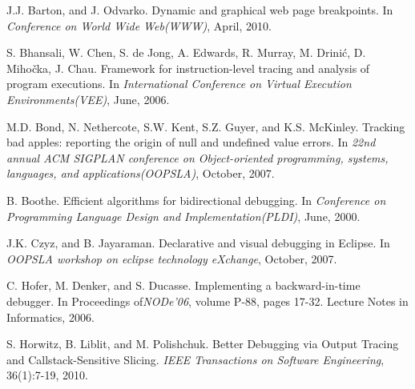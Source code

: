 \documentclass{sig-alternate}
\begin{document}
%

\begin{thebibliography}{16}

J.J. Barton, and J. Odvarko. \newblock Dynamic and graphical web page breakpoints.
\newblock In \emph{Conference on World Wide Web(WWW)},
April, 2010.

S. Bhansali, W. Chen, S. de Jong, A. Edwards, R. Murray, M. Drini\'{c}, D. Miho\v{c}ka, J. Chau. \newblock Framework for instruction-level tracing and analysis of program executions.
\newblock In \emph{International Conference on Virtual Execution Environments(VEE)},
June, 2006.

M.D. Bond, N. Nethercote, S.W. Kent, S.Z. Guyer, and K.S. McKinley. \newblock Tracking bad apples: reporting the origin of null and undefined value errors.
\newblock In \emph{22nd annual ACM SIGPLAN conference on Object-oriented programming, systems, languages, and applications(OOPSLA)},
October, 2007.


B. Boothe. \newblock Efficient algorithms for bidirectional debugging.
\newblock In \emph{Conference on Programming Language Design and Implementation(PLDI)},
June, 2000.

J.K. Czyz, and B. Jayaraman. \newblock Declarative and visual debugging in Eclipse.
\newblock In \emph{OOPSLA workshop on eclipse technology eXchange},
October, 2007.



C. Hofer, M. Denker, and S. Ducasse. \newblock Implementing a backward-in-time debugger.
\newblock In Proceedings of\emph{NODe'06},
volume P-88, pages 17-32. Lecture Notes in Informatics, 2006.

S. Horwitz, B. Liblit, and M. Polishchuk. \newblock Better Debugging via Output Tracing and Callstack-Sensitive Slicing.
\emph{IEEE Transactions on
Software Engineering}, 36(1):7-19, 2010.


\end{thebibliography}
\end{document}
